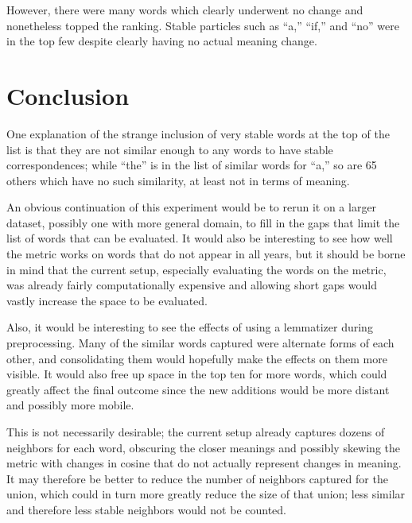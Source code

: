 \documentclass{article}
\begin{document}
However, there were many words which clearly underwent no change and nonetheless topped the ranking. Stable particles such as ``a,'' ``if,'' and ``no'' were in the top few despite clearly having no actual meaning change.

\section{Conclusion}

One explanation of the strange inclusion of very stable words at the top of the list is that they are not similar enough to any words to have stable correspondences; while ``the'' is in the list of similar words for ``a,'' so are 65 others which have no such similarity, at least not in terms of meaning.

An obvious continuation of this experiment would be to rerun it on a larger dataset, possibly one with more general domain, to fill in the gaps that limit the list of words that can be evaluated. It would also be interesting to see how well the metric works on words that do not appear in all years, but it should be borne in mind that the current setup, especially evaluating the words on the metric, was already fairly computationally expensive and allowing short gaps would vastly increase the space to be evaluated.

Also, it would be interesting to see the effects of using a lemmatizer during preprocessing. Many of the similar words captured were alternate forms of each other, and consolidating them would hopefully make the effects on them more visible. It would also free up space in the top ten for more words, which could greatly affect the final outcome since the new additions would be more distant and possibly more mobile.

This is not necessarily desirable; the current setup already captures dozens of neighbors for each word, obscuring the closer meanings and possibly skewing the metric with changes in cosine that do not actually represent changes in meaning. It may therefore be better to reduce the number of neighbors captured for the union, which could in turn more greatly reduce the size of that union; less similar and therefore less stable neighbors would not be counted.
\end{document}
